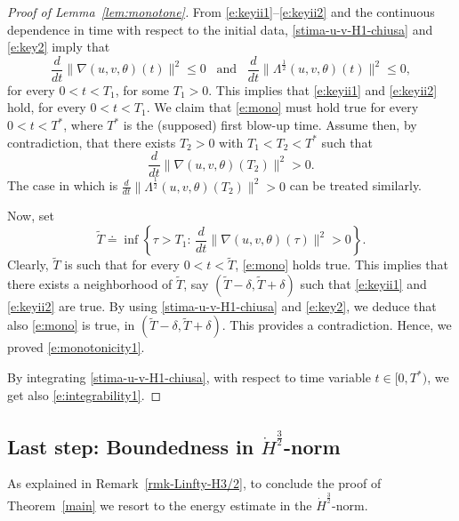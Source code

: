 \documentclass[a4paper]{article}
\begin{document}
\begin{proof}[Proof of Lemma~\ref{lem:monotone}]
  From \eqref{e:keyii1}--\eqref{e:keyii2} and the continuous
  dependence in time with respect to the initial data,
  \eqref{stima-u-v-H1-chiusa} and \eqref{e:key2} imply that
  \begin{equation}
    \label{e:mono} \frac{d}{dt}\| \nabla (u,v,\theta)
    (t)\|^2\leq 0\,\,\, \textrm{ and }\,\,\, \frac{d}{dt} \|
    \Lambda^{\frac12} (u,v,\theta)(t)\|^2 \le 0,
  \end{equation}
  for every $0<t<T_1$, for some $T_1>0$. This implies that
  \eqref{e:keyii1} and \eqref{e:keyii2} hold, for every $0<t<T_1$. We
  claim that \eqref{e:mono} must hold true for every $0<t<T^*$, where
  $T^\ast$ is the (supposed) first blow-up time. Assume then, by
  contradiction, that there exists $T_2>0$ with $T_1 < T_2 <T^*$ such
  that
  \begin{equation*}
    \frac{d}{dt}\|\nabla (u,v,\theta)(T_2)\|^2 >0.
  \end{equation*}
  The case in which is $\frac{d}{dt}\|\Lambda^{\frac{1}{2}} (u,v,\theta)(T_2)\|^2 >0$ can be
  treated similarly.

  Now, set
  \begin{equation*}
    \tilde{T}\doteq \inf\left\{\tau >T_1: \, \frac{d}{dt}\|\nabla (u,v,\theta)(\tau)\|^2 >0\right\}.
  \end{equation*}
  Clearly, $\tilde{T}$ is such that for every $0<t<\tilde{T}$,
  \eqref{e:mono} holds true. This implies that there exists a
  neighborhood of $\tilde{T}$, say
  $(\tilde{T}-\delta, \tilde{T}+\delta)$ such that \eqref{e:keyii1}
  and \eqref{e:keyii2} are true. By using \eqref{stima-u-v-H1-chiusa}
  and \eqref{e:key2}, we deduce that also \eqref{e:mono} is true, in
  $(\tilde{T}-\delta, \tilde{T}+\delta)$. This provides a
  contradiction. Hence, we proved \eqref{e:monotonicity1}.
  
  By integrating \eqref{stima-u-v-H1-chiusa}, with respect to time
  variable $t\in [0, T^\ast)$, we get also \eqref{e:integrability1}.
%
\end{proof}

\subsection{Last step: Boundedness in $\dot H^{\frac32}$-norm}

  As explained in Remark~\ref{rmk-Linfty-H3/2},
  to conclude the proof of Theorem~\ref{main}
  we resort to the energy estimate in the $\dot{H}^{\frac{3}{2}}$-norm.
\end{document}
